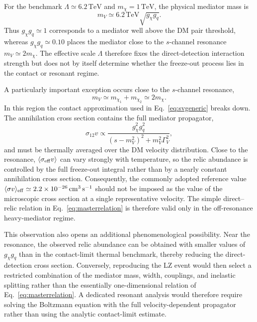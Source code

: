 \documentclass[aps,prd,reprint,superscriptaddress,nofootinbib,longbibliography,floatfix]{revtex4-2}
\newcommand{\TeV}{\mathrm{TeV}}
\begin{document}
For the benchmark $\Lambda\simeq6.2\,\TeV$ and $m_\chi=1\,\TeV$, the physical mediator mass is
\begin{equation}
m_V\simeq6.2\,\TeV\sqrt{g_\chi g_q}.
\end{equation}
Thus $g_\chi g_q\simeq1$ corresponds to a mediator well above the DM pair threshold, whereas $g_\chi g_q\simeq0.10$ places the mediator close to the $s$-channel resonance $m_V\simeq2m_\chi$. The effective scale $\Lambda$ therefore fixes the direct-detection interaction strength but does not by itself determine whether the freeze-out process lies in the contact or resonant regime.




A particularly important exception occurs close to the $s$-channel resonance,
\begin{equation}
m_V\simeq m_{\chi_1}+m_{\chi_2}\simeq2m_\chi.
\end{equation}
In this region the contact approximation used in Eq.~\eqref{eq:svgeneric} breaks down. The annihilation cross section contains the full mediator propagator,
\begin{equation}
\sigma_{12}v\propto
\frac{g_\chi^2g_q^2}
{(s-m_V^2)^2+m_V^2\Gamma_V^2},
\end{equation}
and must be thermally averaged over the DM velocity distribution. Close to the resonance, $\langle\sigma_{\rm eff}v\rangle$ can vary strongly with temperature, so the relic abundance is controlled by the full freeze-out integral rather than by a nearly constant annihilation cross section. Consequently, the commonly adopted reference value $\langle\sigma v\rangle_{\rm eff}\simeq2.2\times10^{-26}\,\mathrm{cm^3\,s^{-1}}$ should not be imposed as the value of the microscopic cross section at a single representative velocity. The simple direct--relic relation in Eq.~\eqref{eq:masterrelation} is therefore valid only in the off-resonance heavy-mediator regime.




This observation also opens an additional phenomenological possibility. Near the resonance, the observed relic abundance can be obtained with smaller values of $g_\chi g_q$ than in the contact-limit thermal benchmark, thereby reducing the direct-detection cross section. Conversely, reproducing the LZ event would then select a restricted combination of the mediator mass, width, couplings, and inelastic splitting rather than the essentially one-dimensional relation of Eq.~\eqref{eq:masterrelation}. A dedicated resonant analysis would therefore require solving the Boltzmann equation with the full velocity-dependent propagator rather than using the analytic contact-limit estimate.
\end{document}
